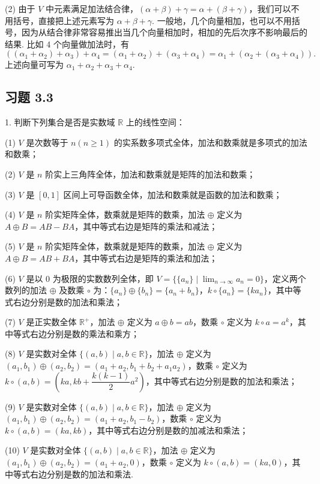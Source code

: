 \documentclass[UTF8,12pt,a4paper,fontset=fandol]{ctexart}
\begin{document}
(2) 由于 $V$ 中元素满足加法结合律，$(\alpha+\beta)+\gamma=\alpha+(\beta+\gamma)$，我们可以不用括号，直接把上述元素写为 $\alpha+\beta+\gamma$. 一般地，几个向量相加，也可以不用括号，因为从结合律非常容易推出当几个向量相加时，相加的先后次序不影响最后的结果. 比如 4 个向量做加法时，有
\[
((\alpha_1+\alpha_2)+\alpha_3)+\alpha_4=(\alpha_1+\alpha_2)+(\alpha_3+\alpha_4)=\alpha_1+(\alpha_2+(\alpha_3+\alpha_4)).
\]
上述向量可写为 $\alpha_1+\alpha_2+\alpha_3+\alpha_4$.

\subsection*{习题 3.3}

1. 判断下列集合是否是实数域 $\mathbb{R}$ 上的线性空间：

(1) $V$ 是次数等于 $n(n\geq 1)$ 的实系数多项式全体，加法和数乘就是多项式的加法和数乘；

(2) $V$ 是 $n$ 阶实上三角阵全体，加法和数乘就是矩阵的加法和数乘；

(3) $V$ 是 $[0,1]$ 区间上可导函数全体，加法和数乘就是函数的加法和数乘；

(4) $V$ 是 $n$ 阶实矩阵全体，数乘就是矩阵的数乘，加法 $\oplus$ 定义为 $A\oplus B=AB-BA$，其中等式右边是矩阵的乘法和减法；

(5) $V$ 是 $n$ 阶实矩阵全体，数乘就是矩阵的数乘，加法 $\oplus$ 定义为 $A\oplus B=AB+BA$，其中等式右边是矩阵的乘法和加法；

(6) $V$ 是以 $0$ 为极限的实数数列全体，即 $V=\{\{a_n\}\mid \lim_{n\to\infty}a_n=0\}$，定义两个数列的加法 $\oplus$ 及数乘 $\circ$ 为：$\{a_n\}\oplus\{b_n\}=\{a_n+b_n\}$，$k\circ\{a_n\}=\{ka_n\}$，其中等式右边分别是数的加法和乘法；

(7) $V$ 是正实数全体 $\mathbb{R}^+$，加法 $\oplus$ 定义为 $a\oplus b=ab$，数乘 $\circ$ 定义为 $k\circ a=a^k$，其中等式右边分别是数的乘法和乘方；

(8) $V$ 是实数对全体 $\{(a,b)\mid a,b\in\mathbb{R}\}$，加法 $\oplus$ 定义为 $(a_1,b_1)\oplus(a_2,b_2)=(a_1+a_2,b_1+b_2+a_1a_2)$，数乘 $\circ$ 定义为 $k\circ(a,b)=(ka,kb+\dfrac{k(k-1)}{2}a^2)$，其中等式右边分别是数的加法和乘法；

(9) $V$ 是实数对全体 $\{(a,b)\mid a,b\in\mathbb{R}\}$，加法 $\oplus$ 定义为 $(a_1,b_1)\oplus(a_2,b_2)=(a_1+a_2,b_1-b_2)$，数乘 $\circ$ 定义为 $k\circ(a,b)=(ka,kb)$，其中等式右边分别是数的加减法和乘法；

(10) $V$ 是实数对全体 $\{(a,b)\mid a,b\in\mathbb{R}\}$，加法 $\oplus$ 定义为 $(a_1,b_1)\oplus(a_2,b_2)=(a_1+a_2,0)$，数乘 $\circ$ 定义为 $k\circ(a,b)=(ka,0)$，其中等式右边分别是数的加法和乘法.
\end{document}
